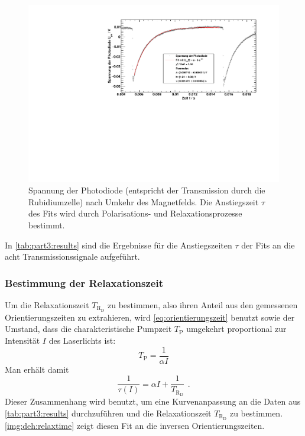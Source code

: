 \begin{figure}[H]
\begin{center}
  \includegraphics[width=\textwidth]{../img/part5/65-5mA-10.pdf}
  \caption{Spannung der Photodiode (entspricht der Transmission durch die Rubidiumzelle)
  nach Umkehr des Magnetfelds.
  Die Anstiegszeit $\tau$ des Fits wird durch Polarisations- und Relaxationsprozesse bestimmt.}
  \label{img:deh:trans3}
\end{center}
\end{figure}


In \autoref{tab:part3:results} sind die Ergebnisse für die Anstiegszeiten $\tau$
der Fits an die acht Transmissionssignale aufgeführt.




\subsubsection*{Bestimmung der Relaxationszeit}
Um die Relaxationszeit $T_{\text{R}_\text{D}}$ zu bestimmen, also ihren Anteil aus den gemessenen Orientierungszeiten zu extrahieren,
wird \autoref{eq:orientierungszeit} benutzt sowie der Umstand,
dass die charakteristische Pumpzeit $T_\text{P}$ umgekehrt proportional zur Intensität $I$ des Laserlichts ist:
\begin{equation}
  T_\text{P} = \frac{1}{\alpha I} 
\end{equation}
Man erhält damit
\begin{equation}
  \frac{1}{\tau(I)}=\alpha I + \frac{1}{T_{\text{R}_\text{D}}} \ \,.
\end{equation}
Dieser Zusammenhang wird benutzt, um eine Kurvenanpassung an die Daten aus \autoref{tab:part3:results}
durchzuführen und die Relaxationszeit $T_{\text{R}_\text{D}}$ zu bestimmen.
\autoref{img:deh:relaxtime} zeigt diesen Fit an die inversen Orientierungszeiten.

